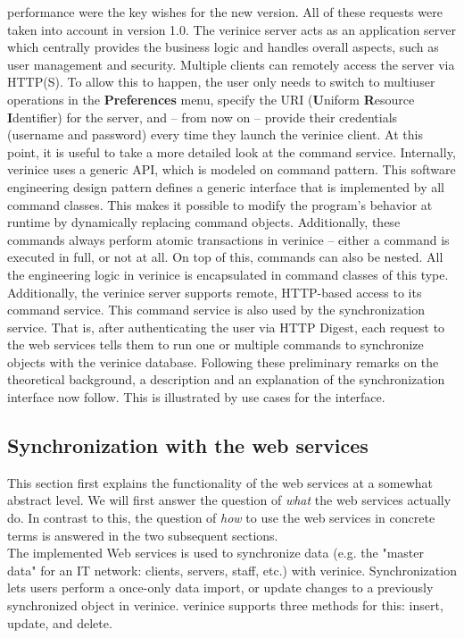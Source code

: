 \documentclass[a4paper,10pt]{book}
\begin{document}
performance were the key wishes for the new version. All of these requests were taken into account in version 1.0.
\newline
The verinice server acts as an application server which centrally provides the business logic and handles
overall aspects, such as user management and security. Multiple clients can remotely access the server
via HTTP(S). To allow this to happen, the user only needs to switch to multiuser operations in the \textbf{Preferences}
menu, specify the URI (\textbf{U}niform \textbf{R}esource \textbf{I}dentifier) for the server, and – from now on – provide
their credentials (username and password) every time they launch the verinice client.
\newline
At this point, it is useful to take a more detailed look at the command service. Internally, verinice uses a
generic API, which is modeled on command pattern. This software engineering design pattern defines a generic
interface that is implemented by all command classes. This makes it possible to modify the program's behavior
at runtime by dynamically replacing command objects.
\newline
Additionally, these commands always perform atomic transactions in verinice – either a command is executed in
full, or not at all. On top of this, commands can also be nested. All the engineering logic in verinice is
encapsulated in command classes of this type. Additionally, the verinice server supports remote, HTTP-based
access to its command service.
\newline
This command service is also used by the synchronization service. That is, after authenticating the user via HTTP
Digest, each request to the web services tells them to run one or multiple commands to synchronize objects with the
verinice database.
\newline
Following these preliminary remarks on the theoretical background, a description and an explanation of the synchronization
interface now follow. This is illustrated by use cases for the interface.

\subsection{Synchronization with the web services}
This section first explains the functionality of the web services at a somewhat abstract level. We will first answer the question of
{\em what} the web services actually do. In contrast to this, the question of {\em how} to use the web services in concrete terms
is answered in the two subsequent sections.
\newline\\
The implemented Web services is used to synchronize data (e.g. the "master data" for an IT network: clients, servers, staff, etc.)
with verinice. Synchronization lets users perform a once-only data import, or update changes to a previously
synchronized object in verinice. verinice supports three methods for this: insert, update, and delete.
\end{document}
